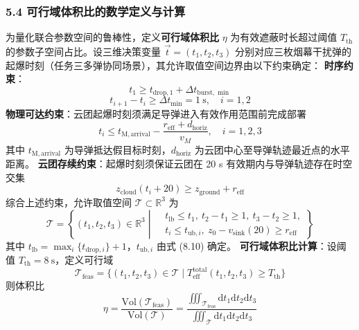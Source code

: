 \documentclass{JXUSTmodeling}
\begin{document}
\subsubsection{5.4 可行域体积比的数学定义与计算}
为量化联合参数空间的鲁棒性，定义\textbf{可行域体积比} $\eta$ 为有效遮蔽时长超过阈值 $T_{\mathrm{th}}$ 的参数子空间占比。设三维决策变量 $\vec{t} = (t_1, t_2, t_3)$ 分别对应三枚烟幕干扰弹的起爆时刻（任务三多弹协同场景），其允许取值空间边界由以下约束确定：
\textbf{时序约束}：
\begin{equation}
t_1 \geq t_{\mathrm{drop},1} + \Delta t_{\mathrm{burst},\min} \tag{8.8}
\end{equation}
\begin{equation}
t_{i+1} - t_i \geq \Delta t_{\min} = 1\ \mathrm{s},\quad i = 1,2 \tag{8.9}
\end{equation}
\textbf{物理可达约束}：云团起爆时刻须满足导弹进入有效作用范围前完成部署
\begin{equation}
t_i \leq t_{\mathrm{M,arrival}} - \frac{r_{\mathrm{eff}} + d_{\mathrm{horiz}}}{v_M},\quad i = 1,2,3 \tag{8.10}
\end{equation}
其中 $t_{\mathrm{M,arrival}}$ 为导弹抵达假目标时刻，$d_{\mathrm{horiz}}$ 为云团中心至导弹轨迹最近点的水平距离。
\textbf{云团存续约束}：起爆时刻须保证云团在 20 s 有效期内与导弹轨迹存在时空交集
\begin{equation}
z_{\mathrm{cloud}}(t_i + 20) \geq z_{\mathrm{ground}} + r_{\mathrm{eff}} \tag{8.11}
\end{equation}
综合上述约束，允许取值空间 $\mathcal{T} \subset \mathbb{R}^3$ 为
\begin{equation}
\mathcal{T} = \left\{(t_1,t_2,t_3) \in \mathbb{R}^3 \middle| \begin{aligned} & t_{\mathrm{lb}} \leq t_1,\ t_2-t_1 \geq 1,\ t_3-t_2 \geq 1, \\ & t_i \leq t_{\mathrm{ub},i},\ z_0 - v_{\mathrm{sink}}(20) \geq r_{\mathrm{eff}} \end{aligned} \right\} \tag{8.12}
\end{equation}
其中 $t_{\mathrm{lb}} = \max_i\{t_{\mathrm{drop},i}\} + 1$，$t_{\mathrm{ub},i}$ 由式 (8.10) 确定。
\textbf{可行域体积比计算}：设阈值 $T_{\mathrm{th}} = 8\ \mathrm{s}$，定义可行域
\begin{equation}
\mathcal{T}_{\mathrm{feas}} = \{(t_1,t_2,t_3) \in \mathcal{T} \mid T_{\mathrm{eff}}^{\mathrm{total}}(t_1,t_2,t_3) \geq T_{\mathrm{th}}\} \tag{8.13}
\end{equation}
则体积比
\begin{equation}
\eta = \frac{\mathrm{Vol}(\mathcal{T}_{\mathrm{feas}})}{\mathrm{Vol}(\mathcal{T})} = \frac{\iiint_{\mathcal{T}_{\mathrm{feas}}} \mathrm{d}t_1\mathrm{d}t_2\mathrm{d}t_3}{\iiint_{\mathcal{T}} \mathrm{d}t_1\mathrm{d}t_2\mathrm{d}t_3} \tag{8.14}
\end{equation}
\end{document}
